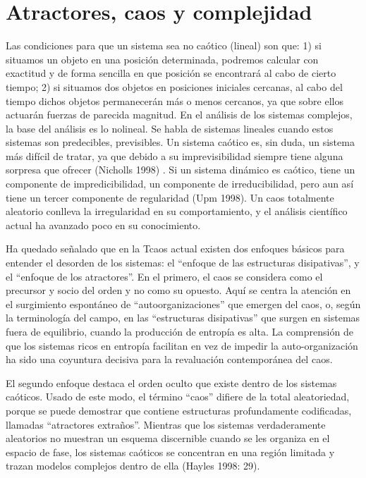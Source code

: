 \documentclass[12pt,a4paper]{book}
\begin{document}
	\section{Atractores, caos y complejidad}
	Las condiciones para que un sistema sea no caótico (lineal) son que: 1) si situamos un objeto en una posición determinada, podremos calcular con exactitud y de forma sencilla en que posición se encontrará al cabo de cierto tiempo; 2) si situamos dos objetos en posiciones iniciales cercanas, al cabo del tiempo dichos objetos permanecerán más o menos cercanos, ya que sobre ellos actuarán fuerzas de parecida magnitud. En el análisis de los sistemas complejos, la base del análisis es lo nolineal. Se habla de sistemas lineales cuando estos sistemas son predecibles, previsibles. Un sistema caótico es, sin duda, un sistema más difícil de tratar, ya que debido a su imprevisibilidad siempre tiene alguna sorpresa que ofrecer (Nicholls 1998) . Si un sistema dinámico es caótico, tiene un componente de impredicibilidad, un componente de irreducibilidad, pero aun así tiene un tercer componente de regularidad (Upm 1998). Un caos totalmente aleatorio conlleva la irregularidad en su comportamiento, y el análisis científico actual ha avanzado poco en su conocimiento.

Ha quedado señalado que en la Tcaos actual existen dos enfoques básicos para entender el desorden de los sistemas: el “enfoque de las estructuras disipativas”, y el “enfoque de los atractores”. En el primero, el caos se considera como el precursor y socio del orden y no como su opuesto. Aquí se centra la atención en el surgimiento espontáneo de “autoorganizaciones” que emergen del caos, o, según la terminología del campo, en las “estructuras disipativas” que surgen en sistemas fuera de equilibrio, cuando la producción de entropía es alta. La comprensión de que los sistemas ricos en entropía facilitan en vez de impedir la auto-organización ha sido una coyuntura decisiva para la revaluación contemporánea del caos.

El segundo enfoque destaca el orden oculto que existe dentro de los sistemas caóticos. Usado de este modo, el término “caos” difiere de la total aleatoriedad, porque se puede demostrar que contiene estructuras profundamente codificadas, llamadas “atractores extraños”. Mientras que los sistemas verdaderamente aleatorios no muestran un esquema discernible cuando se les organiza en el espacio de fase, los sistemas caóticos se concentran en una región limitada y trazan modelos complejos dentro de ella (Hayles 1998: 29).
\end{document}
